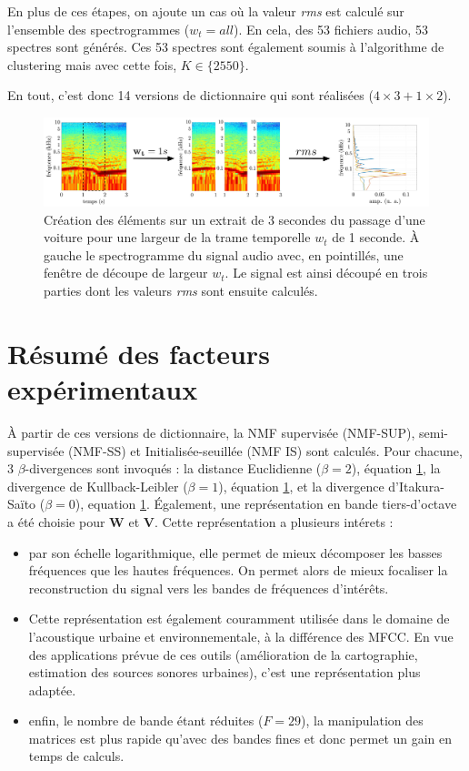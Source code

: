 En plus de ces étapes, on ajoute un cas où la valeur \textit{rms} est calculé sur l'ensemble des spectrogrammes ($w_t = all$). En cela, des 53 fichiers audio, 53 spectres sont générés. Ces 53 spectres sont également soumis à l'algorithme de clustering mais avec cette fois, $K \in \lbrace 25 50 \rbrace$.

En tout, c'est donc 14 versions de dictionnaire qui sont réalisées ($4\times 3 + 1 \times 2$).

\begin{figure}[hbtp]
\centering
\includegraphics[width=.9\linewidth]{./figures/NMF/dictionaire_frame_FR.pdf} 
\caption{Création des éléments sur un extrait de 3 secondes du passage d'une voiture pour une largeur de la trame temporelle $w_t$ de 1 seconde. À gauche le spectrogramme du signal audio avec, en pointillés, une fenêtre de découpe de largeur $w_t$. Le signal est ainsi découpé en trois parties dont les valeurs \textit{rms} sont ensuite calculés. }
\label{fig:decoupe_W}
\end{figure}

\section{Résumé des facteurs expérimentaux}

À partir de ces versions de dictionnaire, la NMF supervisée (NMF-SUP), semi-supervisée (NMF-SS) et Initialisée-seuillée (NMF IS) sont calculés. Pour chacune, 3 $\beta$-divergences sont invoqués : la distance Euclidienne ($\beta = 2$), équation \ref{}, la divergence de Kullback-Leibler ($\beta = 1$), équation \ref{}, et la divergence d'Itakura-Saïto ($\beta = 0$), equation \ref{}.
\'Egalement, une représentation en bande tiers-d'octave a été choisie pour $\mathbf{W}$ et $\mathbf{V}$. Cette représentation a plusieurs intérets : 

\begin{itemize}
\item par son échelle logarithmique, elle permet de mieux décomposer les basses fréquences que les hautes fréquences. On permet alors de mieux focaliser la reconstruction du signal vers les bandes de fréquences d'intérêts.
\item Cette représentation est également couramment utilisée dans le domaine de l'acoustique urbaine et environnementale, à la différence des MFCC. En vue des applications prévue de ces outils (amélioration de la cartographie, estimation des sources sonores urbaines), c'est une représentation plus adaptée.
\item enfin, le nombre de bande étant réduites ($F = 29$), la manipulation des matrices est plus rapide qu'avec des bandes fines et donc permet un gain en temps de calculs.
\end{itemize}

